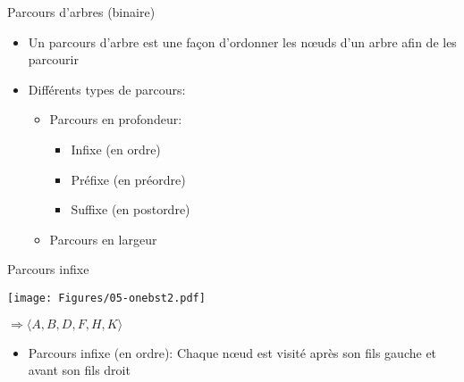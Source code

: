 \begin{frame}{Parcours d'arbres (binaire)}

\begin{itemize}
\item Un parcours d'arbre est une façon d'\alert{ordonner} les n\oe uds d'un arbre afin de les parcourir
\item Différents types de parcours:
\begin{itemize}
\item Parcours en profondeur:
\begin{itemize}
\item Infixe (en ordre)
\item Préfixe (en préordre)
\item Suffixe (en postordre)
\end{itemize}
\item Parcours en largeur
\end{itemize}
\end{itemize}
\end{frame}

\begin{frame}{Parcours infixe}

\begin{center}
\texttt{[image: Figures/05-onebst2.pdf]}
\bigskip

$\Rightarrow \langle A, B, D, F, H, K\rangle$
\end{center}

\begin{itemize}
\item Parcours infixe (en ordre): Chaque n\oe ud est visité \alert{après} son fils gauche et \alert{avant} son fils droit

\bigskip
\begin{center}
\begin{small}
\end{small}
\end{center}

\end{itemize}

\end{frame}

